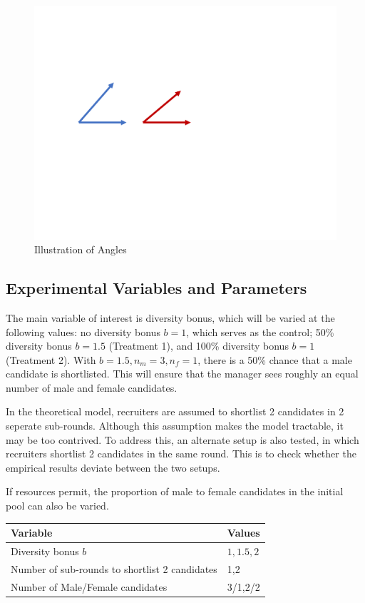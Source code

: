 \documentclass[11pt]{article}
\begin{document}
\begin{figure}[H] %
    \centering
    \includegraphics[width=\textwidth, keepaspectratio]{illus/angles.pdf}
    \caption{Illustration of Angles}
    \label{sample_angles}
\end{figure}

\subsection{Experimental Variables and Parameters}

The main variable of interest is diversity bonus, which will be varied at the following values: no diversity bonus $b=1$, which serves as the control; 50\% diversity bonus $b=1.5$ (Treatment 1), and 100\% diversity bonus $b=1$ (Treatment 2). With $b=1.5, n_m=3, n_f=1$, there is a 50\% chance that a male candidate is shortlisted. This will ensure that the manager sees roughly an equal number of male and female candidates.

In the theoretical model, recruiters are assumed to shortlist 2 candidates in 2 seperate sub-rounds. Although this assumption makes the model tractable, it may be too contrived. To address this, an alternate setup is also tested, in which recruiters shortlist 2 candidates in the same round. This is to check whether the empirical results deviate between the two setups.

If resources permit, the proportion of male to female candidates in the initial pool can also be varied.

\begin{center}
    \begin{tabular}{ l l}
        \hline
        Variable                                       & Values    \\
        \hline
        Diversity bonus $b$                            & $1,1.5,2$ \\
        Number of sub-rounds to shortlist 2 candidates & 1,2       \\
        Number of Male/Female candidates               & 3/1,2/2
    \end{tabular}
\end{center}
\end{document}

